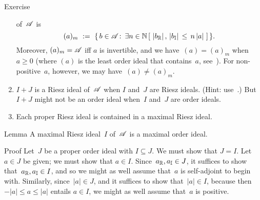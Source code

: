 \documentclass[a]{subfiles}
\begin{document}
\begin{parsec}
\begin{point}{Exercise}
\begin{enumerate}
of~$\mathscr{A}$ is
\begin{equation*}
(a)_m\ :=\ \{\,b\in \mathscr{A}\colon\, 
\exists n\in \mathbb{N}\,[\ \left|b_{\mathbb{R}}\right|,\,\left|b_{\mathbb{I}}\right|
\,\leq\, n\left|a\right| \ ]\,\}.
\end{equation*}
Moreover,  $(a)_m=\mathscr{A}$ iff $a$ is invertible,
and we have~$(a)=(a)_m$ when~$a\geq 0$
(where $(a)$ is the least order ideal that contains~$a$,
see~).
For non-positive~$a$, however, we may have~$(a)\neq (a)_m$.
\item
$I+J$ is a Riesz ideal of~$\mathscr{A}$
when $I$ and~$J$ are Riesz ideals. (Hint: use~.)
But~$I+J$ might not be an order ideal
when~$I$ and~$J$ are order ideals.

\item
Each proper Riesz ideal is contained in a maximal Riesz ideal.
\end{enumerate}
\end{point}
\begin{point}{Lemma}%
A maximal Riesz ideal~$I$ of~$\mathscr{A}$
is a maximal order ideal.
\begin{point}{Proof}%
Let~$J$ be a proper order ideal with $I\subseteq J$.
We must show that $J=I$.
Let~$a\in J$ be given;
we must show that $a\in I$.
Since~$a_{\mathbb{R}},a_{\mathbb{I}}\in J$,
it suffices to show that~$a_{\mathbb{R}},a_{\mathbb{I}}\in I$,
and so we might as well assume that~$a$ is self-adjoint
to begin with.
Similarly,
since~$\left|a\right|\in J$,
and it suffices to show that~$\left|a\right|\in I$,
because then $-\left|a\right|\leq a\leq \left|a\right|$
entails $a\in I$,
we might as well assume that~$a$ is positive.


\end{point}
\end{point}
\end{parsec}
\end{document}

